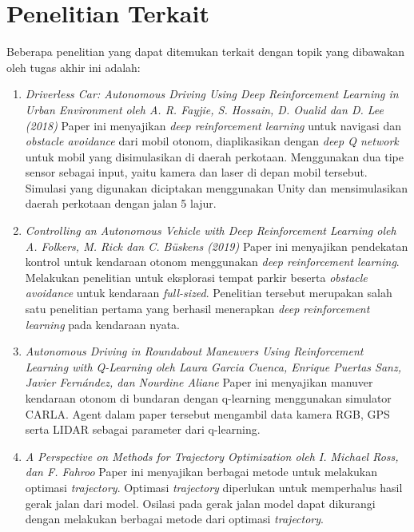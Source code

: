 \section{Penelitian Terkait}
\label{sec:penelitian_terkait}

Beberapa penelitian yang dapat ditemukan terkait dengan topik yang dibawakan oleh tugas akhir ini adalah:
\begin{enumerate}
	\item \textit{Driverless Car: Autonomous Driving Using Deep Reinforcement Learning in Urban Environment oleh A. R. Fayjie, S. Hossain, D. Oualid dan D. Lee (2018)}\newline
	Paper ini menyajikan \textit{deep reinforcement learning }untuk navigasi dan \textit{obstacle avoidance }dari mobil otonom, diaplikasikan dengan \textit{deep Q network }untuk mobil yang disimulasikan di daerah perkotaan. Menggunakan dua tipe sensor sebagai input, yaitu kamera dan laser di depan mobil tersebut. Simulasi yang digunakan diciptakan menggunakan Unity dan mensimulasikan daerah perkotaan dengan jalan 5 lajur.\cite{cit:1}
	
	\item \textit{Controlling an Autonomous Vehicle with Deep Reinforcement Learning oleh A. Folkers, M. Rick dan C. Büskens (2019)}\newline
	Paper ini menyajikan pendekatan kontrol untuk kendaraan otonom menggunakan \textit{deep reinforcement learning}. Melakukan penelitian untuk eksplorasi tempat parkir beserta \textit{obstacle avoidance }untuk kendaraan \textit{full-sized}. Penelitian tersebut merupakan salah satu penelitian pertama yang berhasil menerapkan \textit{deep reinforcement learning }pada kendaraan nyata.\cite{cit:2}
	
	\item \textit{Autonomous Driving in Roundabout Maneuvers Using Reinforcement Learning with Q-Learning oleh Laura Garcia Cuenca, Enrique Puertas Sanz, Javier Fernández, dan Nourdine Aliane}\newline
	Paper ini menyajikan manuver kendaraan otonom di bundaran dengan q-learning menggunakan simulator CARLA.\cite{cit:autonomdrive_roundabout_qlearning} Agent dalam paper tersebut mengambil data kamera RGB, GPS serta LIDAR sebagai parameter dari q-learning.

	\item \textit{A Perspective on Methods for Trajectory Optimization oleh I. Michael Ross, dan F. Fahroo
	}\newline
	Paper ini menyajikan berbagai metode untuk melakukan optimasi \textit{trajectory}\cite{cit:trajectory_optimization}. Optimasi \textit{trajectory} diperlukan untuk memperhalus hasil gerak jalan dari model. Osilasi pada gerak jalan model dapat dikurangi dengan melakukan berbagai metode dari optimasi \textit{trajectory}.
	
\end{enumerate}

